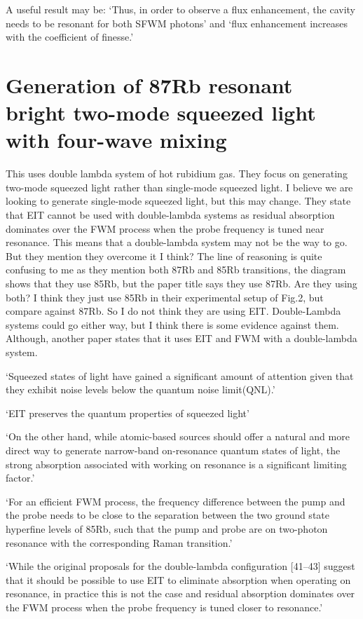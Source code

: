 \documentclass[aps,pra,twocolumn,showpacs,amsmath,amssymb,nofootinbib,longbibliography,superscriptaddress
]{revtex4-1}
\theoremstyle{definition}
\theoremstyle{remark}
\newcommand{\0}{\hat{0}}
\begin{document}
A useful result may be: `Thus, in order to observe a flux enhancement, the cavity needs to be resonant for both SFWM photons' and `flux enhancement increases with
the coeﬃcient of finesse.'


\section{Generation of 87Rb resonant bright two-mode squeezed light with four-wave mixing}

This uses double lambda system of hot rubidium gas. They focus on generating two-mode squeezed light rather than single-mode squeezed light. I believe we are looking to generate single-mode squeezed light, but this may change. They state that EIT cannot be used with double-lambda systems as residual absorption dominates over the FWM process when the probe frequency is tuned near resonance. This means that a double-lambda system may not be the way to go. But they mention they overcome it I think? The line of reasoning is quite confusing to me as they mention both 87Rb and 85Rb transitions, the diagram shows that they use 85Rb, but the paper title says they use 87Rb. Are they using both? I think they just use 85Rb in their experimental setup of Fig.2, but compare against 87Rb. So I do not think they are using EIT. Double-Lambda systems could go either way, but I think there is some evidence against them. Although, another paper states that it uses EIT and FWM with a double-lambda system.



`Squeezed states of light have gained a significant amount of attention given that they exhibit noise levels below the quantum noise limit(QNL).'

`EIT preserves the quantum properties of squeezed light'

`On the other hand, while atomic-based sources should oﬀer a natural and more direct way to generate narrow-band on-resonance quantum states of light, the strong absorption associated with working on resonance is a significant limiting factor.'

`For an eﬃcient FWM process, the frequency diﬀerence between the pump and the probe needs to be close to the separation between the two ground state hyperfine levels of 85Rb, such that the pump and probe are on two-photon resonance with the corresponding Raman transition.'

`While the original proposals for the double-lambda configuration [41–43] suggest that it should be possible to use EIT to eliminate absorption when operating on resonance, in practice this is not the case and residual absorption dominates over the FWM process when the probe frequency is tuned closer to resonance.'
\end{document}
